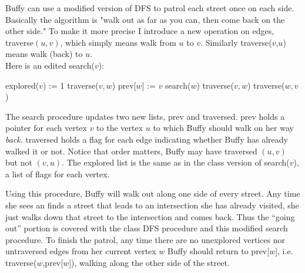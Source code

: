 \documentclass[11pt]{article}
\begin{document}
\par{Buffy can use a modified version of DFS to patrol each street once on each side. Basically the algorithm is "walk out as far as you can, then come back on the other side." To make it more precise I introduce a new operation on edges, traverse$(u,v)$, which simply means walk from $u$ to $v$. Similarly traverse($v$,$u$) means walk (back) to $u$. }
\\ Here is an edited search($v$):
\begin{algorithmic}
\STATE explored($v$) := 1
\STATE traverse($v,w$)
\STATE prev[$w$] := $v$
\STATE search($w$)
\STATE traverse($v,w$)
\STATE traverse($w,v$)
\ENDIF
\ENDFOR
\end{algorithmic}

\par{The search procedure updates two new lists, prev and traversed. prev holds a pointer for each vertex $v$ to the vertex $u$ to which Buffy should walk on her way \emph{back}. traversed holds a flag for each edge indicating whether Buffy has already walked it or not. Notice that order matters, Buffy may have traversed $(u,v)$ but not $(v,u)$. The explored list is the same as in the class version of search($v$), a list of flags for each vertex.}
\par{Using this procedure, Buffy will walk out along one side of every street. Any time she sees an finds a street that leads to an intersection she has already visited, she just walks down that street to the intersection and comes back. Thus the ``going out'' portion is covered with the class DFS procedure and this modified search procedure. To finish the patrol, any time there are no unexplored vertices nor untraversed edges from her current vertex $w$ Buffy should return to prev[$w$], i.e. traverse($w$,prev[$w$]), walking along the other side of the street.}
\end{document}
